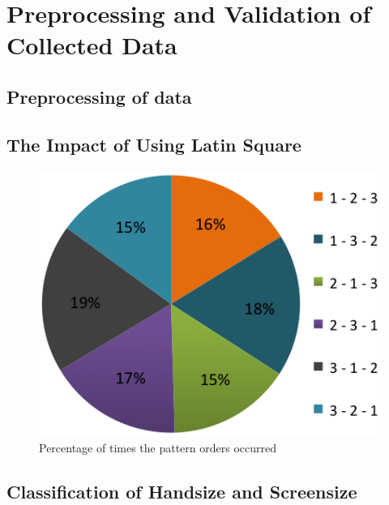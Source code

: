 \section{Preprocessing and Validation of Collected Data}


	\subsection{Preprocessing of data}

	\subsection{The Impact of Using Latin Square} \label{sec:latinsquareimpact}


		\begin{figure}[H]
      \centering
      \includegraphics[scale=0.5]{pics/analysis/patternOrder.png}
      \caption{Percentage of times the pattern orders occurred}
      \label{fig:patternOrder}
    \end{figure}

  \subsection{Classification of Handsize and Screensize} \label{sec:classificationhandsizescreensize}

